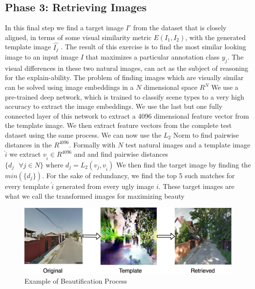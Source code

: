 \subsection{Phase 3: Retrieving Images }
In this final step we find a target image $I'$ from the dataset that is closely aligned, in terms of some visual similarity metric $E(I_1, I_2)$, with the generated template image  $\hat{I_j}$ . The result of this exercise is to find the most similar looking image to an input image $I$ that maximizes a particular annotation class $y_j$.
The visual differences in these two natural images, can act as the subject of reasoning for the explain-ability.
The problem of finding images which are visually similar can be solved using image embeddings in a $N$ dimensional space $R^N$
We use a pre-trained deep  network, which is trained to classify scene types to a very high accuracy \cite{zhou2014learning} to extract the image embeddings. We use the last but one fully connected layer of this network to extract a 4096 dimensional feature vector from the template image. We then extract feature vectors from the complete test dataset using the same process. We can now use the $L_2$ Norm to find pairwise distances in the $R^{4096}$. Formally with $N$ test natural images and a template image $\hat{i}$ we extract $v_{\hat{i}} \in R^{4096}$ and and find pairwise distances  $\{d_j \text{  }\forall j \in N\} \text{ where } d_j = L_2(v_j , v_{\hat{i}})$ 
We then find the target image by finding the $min(\{d_j\})$. For the sake of redundancy, we find the top 5 such matches for every template $\hat{i}$ generated from every ugly image $i$. These target images are what we call the transformed images for maximizing beauty

\begin{figure}[h]
	\centering
	\includegraphics[width=0.5\linewidth]{Plot/Example.png}
	\caption{Example of Beautification Process}
	\label{fig:BeautyExample}
\end{figure}

